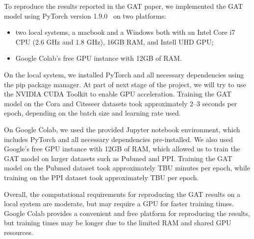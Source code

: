 To reproduce the results reported in the GAT paper, we implemented the GAT model using PyTorch version 1.9.0~\cite{paszke2019pytorch} on two platforms:
\begin{itemize}
    \item two local systems, a macbook and a Windows both with an Intel Core i7 CPU (2.6 GHz and 1.8 GHz), 16GB RAM,
    and Intell UHD GPU;
    \item Google Colab's free GPU instance with 12GB of RAM\@.
\end{itemize}

On the local system, we installed PyTorch and all necessary dependencies using the pip package manager.
At part of next stage of the project, we will try to use the NVIDIA CUDA Toolkit to enable GPU acceleration.
Training the GAT model on the Cora and Citeseer datasets took approximately 2--3 seconds per epoch, depending on the
batch size and learning rate used.

On Google Colab, we used the provided Jupyter notebook environment, which includes PyTorch and all necessary dependencies pre-installed.
We also used Google's free GPU instance with 12GB of RAM, which allowed us to train the GAT model on larger datasets such as Pubmed and PPI.
Training the GAT model on the Pubmed dataset took approximately TBU minutes per epoch, while training on the PPI
dataset took approximately TBU per epoch.

Overall, the computational requirements for reproducing the GAT results on a local system are moderate, but may require a GPU for faster training times.
Google Colab provides a convenient and free platform for reproducing the results, but training times may be longer due to the limited RAM and shared GPU resources.
